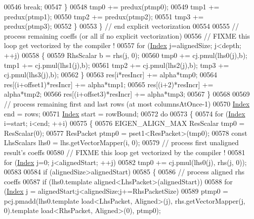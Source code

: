 \begin{DoxyCode}
{{00546             \textcolor{keywordflow}{break};
00547         \}
00548         tmp0 += predux(ptmp0);
00549         tmp1 += predux(ptmp1);
00550         tmp2 += predux(ptmp2);
00551         tmp3 += predux(ptmp3);
00552       \}
00553     \} \textcolor{comment}{// end explicit vectorization}
00554 
00555     \textcolor{comment}{// process remaining coeffs (or all if no explicit vectorization)}
00556     \textcolor{comment}{// FIXME this loop get vectorized by the compiler !}
00557     \textcolor{keywordflow}{for} (\hyperlink{namespace_eigen_a62e77e0933482dafde8fe197d9a2cfde}{Index} j=alignedSize; j<depth; ++j)
00558     \{
00559       RhsScalar b = rhs(j, 0);
00560       tmp0 += cj.pmul(lhs0(j),b); tmp1 += cj.pmul(lhs1(j),b);
00561       tmp2 += cj.pmul(lhs2(j),b); tmp3 += cj.pmul(lhs3(j),b);
00562     \}
00563     res[i*resIncr]            += alpha*tmp0;
00564     res[(i+offset1)*resIncr]  += alpha*tmp1;
00565     res[(i+2)*resIncr]        += alpha*tmp2;
00566     res[(i+offset3)*resIncr]  += alpha*tmp3;
00567   \}
00568 
00569   \textcolor{comment}{// process remaining first and last rows (at most columnsAtOnce-1)}
00570   \hyperlink{namespace_eigen_a62e77e0933482dafde8fe197d9a2cfde}{Index} end = rows;
00571   \hyperlink{namespace_eigen_a62e77e0933482dafde8fe197d9a2cfde}{Index} start = rowBound;
00572   \textcolor{keywordflow}{do}
00573   \{
00574     \textcolor{keywordflow}{for} (\hyperlink{namespace_eigen_a62e77e0933482dafde8fe197d9a2cfde}{Index} i=start; i<end; ++i)
00575     \{
00576       EIGEN\_ALIGN\_MAX ResScalar tmp0 = ResScalar(0);
00577       ResPacket ptmp0 = pset1<ResPacket>(tmp0);
00578       \textcolor{keyword}{const} LhsScalars lhs0 = lhs.getVectorMapper(i, 0);
00579       \textcolor{comment}{// process first unaligned result's coeffs}
00580       \textcolor{comment}{// FIXME this loop get vectorized by the compiler !}
00581       \textcolor{keywordflow}{for} (\hyperlink{namespace_eigen_a62e77e0933482dafde8fe197d9a2cfde}{Index} j=0; j<alignedStart; ++j)
00582         tmp0 += cj.pmul(lhs0(j), rhs(j, 0));
00583 
00584       \textcolor{keywordflow}{if} (alignedSize>alignedStart)
00585       \{
00586         \textcolor{comment}{// process aligned rhs coeffs}
00587         \textcolor{keywordflow}{if} (lhs0.template aligned<LhsPacket>(alignedStart))
00588           \textcolor{keywordflow}{for} (\hyperlink{namespace_eigen_a62e77e0933482dafde8fe197d9a2cfde}{Index} j = alignedStart;j<alignedSize;j+=RhsPacketSize)
00589             ptmp0 = pcj.pmadd(lhs0.template load<LhsPacket, Aligned>(j), rhs.getVectorMapper(j, 0).template
       load<RhsPacket, Aligned>(0), ptmp0);
}}
\end{DoxyCode}
